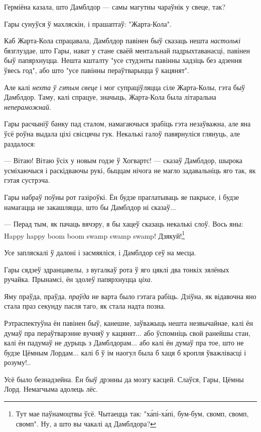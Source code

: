 Герміёна казала, што Дамблдор --- самы магутны чараўнік у свеце, так?

Гары сунуўся ў махляскін, і прашаптаў: "Жарта-Кола".

Каб Жарта-Кола спрацавала, Дамблдор павінен быў сказаць нешта 
\emph{настолькі} бязглуздае, што Гары, нават у стане сваёй 
ментальнай падрыхтаванасці, павінен быў папярхнуцца.
Нешта кшталту "усе студэнты павінны хадзіць без адзення ўвесь год", або што 
"усе павінны пераўтварыцца ў кацянят".

Але калі \emph{нехта ў гэтым свеце} і мог супраціўляцца сіле Жарта-Колы, гэта 
быў Дамблдор. Таму, калі спрацуе, значыць, Жарта-Кола была літаральна 
\emph{непераможнай}.

Гары расчыніў банку пад сталом, намагаючыся зрабіць гэта незаўважна, але 
яна ўсё роўна выдала ціхі свісцячы гук. Некалькі галоў павярнуліся глянуць, 
але раздалося:

--- Вітаю! Вітаю ўсіх у новым годзе ў Хогвартс! --- сказаў Дамблдор,
шырока усміхаючыся і раскідваючы рукі, быццам нічога не магло задавальніць яго 
так, як гэтая сустрэча.

Гары набраў поўны рот газіроўкі. Ён будзе праглатываць яе пакрысе, і будзе намагацца 
не закашляцца, што бы Дамблдор ні сказаў...

--- Перад тым, як пачаць вячэру, я бы хацеў сказаць некалькі слоў. Вось яны:
Happy happy boom boom swamp swamp swamp! Дзякуй!\footnote{{} Тут мае паўнамоцтвы ўсё.
Чытаецца так: "х\'апі-х\'апі, бум-бум, свомп, свомп, свомп". Ну, а што вы чакалі ад Дамблдора?}

Усе запляскалі ў далоні і засмяяліся, і Дамблдор сеў на месца.

Гары сядзеў здранцавелы, з вугалкаў рота ў яго цяклі два тонкіх зялёных ручайка. 
Прынамсі, ён здолеў папярхнуцца \emph{ціха}.

Яму праўда, праўда, \emph{праўда} не варта было гэтага рабіць. Дзіўна, 
як відавочна яно стала праз секунду пасля таго, як стала надта позна.

Рэтраспектуўна ён павінен быў, канешне, заўважыць нешта незвычайнае, калі ён 
думаў пра пераўтварэнне вучняў у кацянят... або ўспомніць свой ранейшы стан, 
калі ён падумаў не дурыць з Дамблдорам... або калі ён думаў пра тое, што не 
будзе Цёмным Лордам... калі б ў ім наогул была б хаця б кропля ўважлівасці і розуму!..

Усё было безнадзейна. Ён быў дрэнны да мозгу касцей. Слаўся, Гары, Цёмны Лорд. 
Немагчыма адолець лёс.

